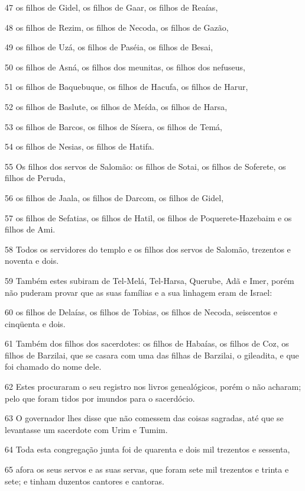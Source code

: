 \par 47 os filhos de Gidel, os filhos de Gaar, os filhos de Reaías,
\par 48 os filhos de Rezim, os filhos de Necoda, os filhos de Gazão,
\par 49 os filhos de Uzá, os filhos de Paséia, os filhos de Besai,
\par 50 os filhos de Asná, os filhos dos meunitas, os filhos dos nefuseus,
\par 51 os filhos de Baquebuque, os filhos de Hacufa, os filhos de Harur,
\par 52 os filhos de Baslute, os filhos de Meída, os filhos de Harsa,
\par 53 os filhos de Barcos, os filhos de Sísera, os filhos de Temá,
\par 54 os filhos de Nesias, os filhos de Hatifa.
\par 55 Os filhos dos servos de Salomão: os filhos de Sotai, os filhos de Soferete, os filhos de Peruda,
\par 56 os filhos de Jaala, os filhos de Darcom, os filhos de Gidel,
\par 57 os filhos de Sefatias, os filhos de Hatil, os filhos de Poquerete-Hazebaim e os filhos de Ami.
\par 58 Todos os servidores do templo e os filhos dos servos de Salomão, trezentos e noventa e dois.
\par 59 Também estes subiram de Tel-Melá, Tel-Harsa, Querube, Adã e Imer, porém não puderam provar que as suas famílias e a sua linhagem eram de Israel:
\par 60 os filhos de Delaías, os filhos de Tobias, os filhos de Necoda, seiscentos e cinqüenta e dois.
\par 61 Também dos filhos dos sacerdotes: os filhos de Habaías, os filhos de Coz, os filhos de Barzilai, que se casara com uma das filhas de Barzilai, o gileadita, e que foi chamado do nome dele.
\par 62 Estes procuraram o seu registro nos livros genealógicos, porém o não acharam; pelo que foram tidos por imundos para o sacerdócio.
\par 63 O governador lhes disse que não comessem das coisas sagradas, até que se levantasse um sacerdote com Urim e Tumim.
\par 64 Toda esta congregação junta foi de quarenta e dois mil trezentos e sessenta,
\par 65 afora os seus servos e as suas servas, que foram sete mil trezentos e trinta e sete; e tinham duzentos cantores e cantoras.

